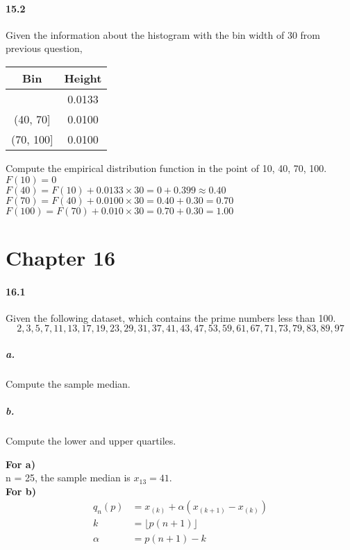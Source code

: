 \documentclass[11pt]{article} %
\begin{document}
\paragraph*{15.2} Given the information about the histogram with the bin width of 30 from previous question, 
\begin{table}[h!]
\centering
\begin{tabular}{cc} \\ \hline \hline 
Bin & Height \\ \hline 
[10, 40]  & 0.0133 \\
(40, 70] & 0.0100 \\
(70, 100] & 0.0100 \\
\hline \hline
\end{tabular}
\end{table}
Compute the empirical distribution function in the point of 10, 40, 70, 100. \\
$F(10) = 0$\\
$F(40) = F(10) + 0.0133\times 30 = 0 + 0.399 \approx 0.40$ \\
$F(70) = F(40) + 0.0100 \times 30 = 0.40 + 0.30 = 0.70$ \\
$F(100) = F(70) + 0.010 \times 30 = 0.70 + 0.30 = 1.00$

\section{Chapter 16}

\paragraph*{16.1} Given the following dataset, which contains the prime numbers less than 100. 
$$
2, 3, 5, 7, 11, 13, 17, 19, 23, 29, 31, 37, 41, 43, 47, 53, 59, 61, 67, 71, 73, 79, 83, 89, 97
$$
\subparagraph*{a.} Compute the sample median. 
\subparagraph*{b.} Compute the lower and upper quartiles. 

{\bf For a)} \\
n = 25, the sample median is $x_{13} = 41$. \\

{\bf For b)} \\
\begin{align*}
q_n(p) & =  x_{(k)} + \alpha \left( x_{(k+1)} - x_{(k)}\right) \\
k & = \lfloor p(n+1) \rfloor \\
\alpha & = p(n+1) - k
\end{align*}
\end{document}
